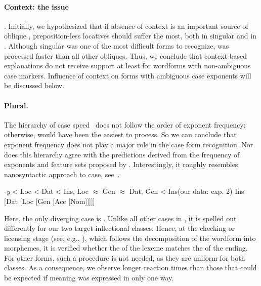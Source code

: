 \documentclass[output=paper, modfonts,newtxmath,hidelinks]{langscibook}
\begin{document}
\paragraph*{Context: the  issue}. Initially, we hypothesized that if absence of context is an important source of oblique , preposition-less locatives should suffer the most, both in singular and in . Although   singular was one of the most difficult forms to recognize,   was processed faster than all other obliques. Thus, we conclude that context-based explanations do not receive support at least for wordforms with non-ambiguous case markers. Influence of context on forms with ambiguous case exponents will be discussed below.\\

\paragraph*{Plural.} The hierarchy of  case  speed~ does not follow the order of exponent frequency: otherwise,  would have been the easiest to process. So we can conclude that exponent frequency does not play a major role in the case form recognition. Nor does this hierarchy agree with the predictions derived from the frequency of exponents and feature sets proposed by \citet{muller2004decomposing, wiese2004categories, wunderlich2004there}. Interestingly, it roughly resembles  nanosyntactic approach to  case, see~.

\ea \ea	\label{ex:plHierarchy} -\textit{y} < Loc < Dat < Ins, Loc $\approx$ Gen $\approx$ Dat, Gen < Ins\hfill (our data: exp. 2)
    \ex \label{ex:cahafunc} \ob Ins [Dat [Loc [Gen [Acc [Nom]]]]]\cb
    \z 
\z

\noindent Here, the only diverging case is . Unlike all other cases in , it is spelled out differently for our two target inflectional classes. Hence, at the checking or licensing stage (see, e.g., \citealt{bertram2000role}), which follows the decomposition of the wordform into morphemes,  it is verified whether the  of the lexeme matches the  of the ending. For other  forms, such a procedure is not needed, as they are uniform for both classes. As a consequence, we observe longer reaction times than those that could be expected if   meaning was expressed in only one way.
\end{document}
